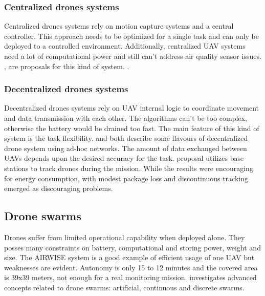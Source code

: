 \documentclass[journal]{IEEEtran}
\begin{document}
\subsubsection{Centralized drones systems}
Centralized drones systems rely on motion capture systems and a central controller. This approach needs to be optimized for a single task and can only be deployed to a controlled environment. Additionally, centralized UAV systems need a lot of computational power and still can't address air quality sensor issues. \cite{collav}, \cite{ragno} \cite{centralized} are proposals for this kind of system. .

\subsubsection{Decentralized drones systems}
Decentralized drones systems rely on UAV internal logic to coordinate movement and data transmission with each other. The algorithms can't be too complex, otherwise the battery would be drained too fast. The main feature of this kind of system is the task flexibility. \cite{swarmtrack} and \cite{cognitivesw} both describe some flavours of decentralized drone system using ad-hoc networks. The amount of data exchanged between UAVs depends upon the desired accuracy for the task. \cite{swarmtrack} proposal utilizes base stations to track drones during the mission. While the results were encouraging for energy consumption, with modest package loss and discontinuous tracking emerged as discouraging problems.


\subsection{Drone swarms}
Drones suffer from limited operational capability when deployed alone. They posses many constraints on battery, computational and storing power, weight and size. The AIRWISE \cite{airwise} system is a good example of efficient usage of one UAV but weaknesses are evident. Autonomy is only 15 to 12 minutes and the covered area is 39x39 meters, not enough for a real monitoring mission. \cite{cognitivesw} investigates advanced concepts related to drone swarms: artificial, continuous and discrete swarms. 
\end{document}
